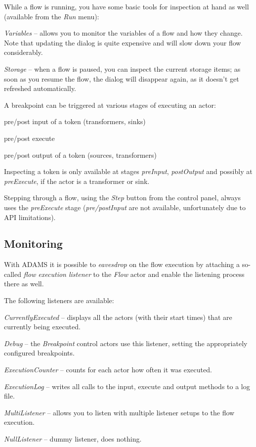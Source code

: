 While a flow is running, you have some basic tools for inspection at hand as 
well (available from the \textit{Run} menu):
\begin{tight_itemize}
	\item \textit{Variables} -- allows you to monitor the variables of a flow
	and how they change. Note that updating the dialog is quite expensive and
	will slow down your flow considerably.
	\item \textit{Storage} -- when a flow is paused, you can inspect the 
	current storage items; as soon as you resume the flow, the dialog will 
	disappear again, as it doesn't get refreshed automatically.
\end{tight_itemize}
A breakpoint can be triggered at various stages of executing an actor:
\begin{tight_itemize}
  \item pre/post input of a token (transformers, sinks)
  \item pre/post execute
  \item pre/post output of a token (sources, transformers)
\end{tight_itemize}
Inspecting a token is only available at stages \textit{preInput},
\textit{postOutput} and possibly at \textit{preExecute}, if the
actor is a transformer or sink.

Stepping through a flow, using the \textit{Step} button from the control
panel, always uses the \textit{preExecute} stage (\textit{pre/postInput}
are not available, unfortunately due to API limitations).

\subsection{Monitoring}
With ADAMS it is possible to \textit{eavesdrop} on the flow execution by 
attaching a so-called \textit{flow execution listener} to the \textit{Flow}
actor and enable the listening process there as well.

The following listeners are available:
\begin{tight_itemize}
	\item \textit{CurrentlyExecuted} -- displays all the actors (with their 
	start times) that are currently being executed.
	\item \textit{Debug} -- the \textit{Breakpoint} control actors use
	this listener, setting the appropriately configured breakpoints.
	\item \textit{ExecutionCounter} -- counts for each actor how often it was
	executed.
	\item \textit{ExecutionLog} -- writes all calls to the input, execute 
	and output methods to a log file.
	\item \textit{MultiListener} -- allows you to listen with multiple 
	listener setups to the flow execution.
	\item \textit{NullListener} -- dummy listener, does nothing.
\end{tight_itemize}


